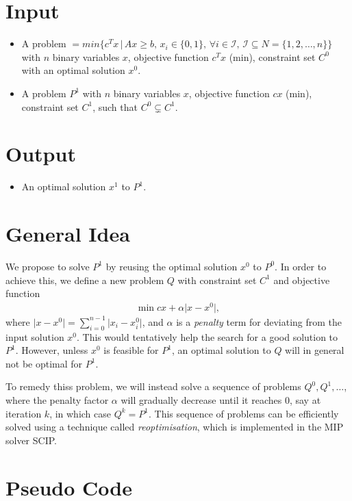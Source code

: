 \documentclass[11pt]{article}
\theoremstyle{definition}
\begin{document}
\section{Input}
\begin{itemize}
    \item A problem $ = min \{ c^Tx\,|\, Ax \geq b,\, x_i \in \{0,1\},\, \forall i \in \mathcal{I}, \,\mathcal{I} \subseteq N = \{1,2,\dots,n \}   \}$ with $n$ binary variables $x$, objective function $c^T x$ (min), constraint set $C^0$ with an optimal solution $x^0$.
    \item A problem $P^1$ with $n$ binary variables $x$, objective function $c x$ (min), constraint set $C^1$, such that $C^0 \subsetneq C^1$.
\end{itemize}							

\section{Output}
\begin{itemize}	
    \item An optimal solution $x^1$ to $P^1$.
\end{itemize}

\section{General Idea}
We propose to solve $P^1$ by reusing the optimal solution $x^0$ to $P^0$.
In order to achieve this, we define a new problem $Q$ with constraint set $C^1$ and objective function
\begin{align*}
    \min c x + \alpha \lvert x - x^0 \rvert,					
\end{align*}
where $\lvert x - x^0 \rvert = \sum_{i=0}^{n-1}\lvert x_i - x^0_i \rvert$, and $\alpha$ is a \emph{penalty} term for deviating from the input solution $x^0$.
This would tentatively help the search for a good solution to $P^1$.
However, unless $x^0$ is feasible for $P^1$, an optimal solution to $Q$ will in general not be optimal for $P^1$.

To remedy thiss problem, we will instead solve a sequence of problems $Q^0, Q^1, \dots$, where the penalty factor $\alpha$ will gradually decrease until it reaches 0, say at iteration $k$, in which case $Q^k = P^1$.
This sequence of problems can be efficiently solved using a technique called \emph{reoptimisation}, which is implemented in the MIP solver SCIP.

\section{Pseudo Code}
\end{document}
